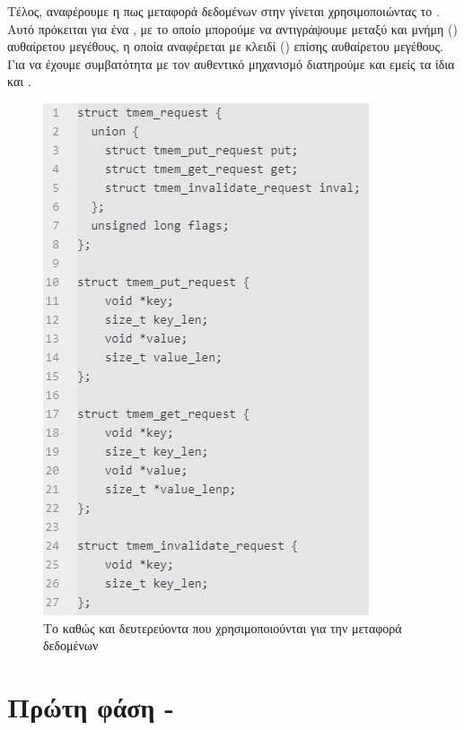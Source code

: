 Τέλος, αναφέρουμε η πως μεταφορά δεδομένων στην  γίνεται
χρησιμοποιώντας το . Αυτό πρόκειται για
ένα , με το οποίο μπορούμε να αντιγράψουμε μεταξύ
 και  μνήμη () αυθαίρετου μεγέθους, η οποία
αναφέρεται με κλειδί () επίσης αυθαίρετου μεγέθους. Για να
έχουμε συμβατότητα με τον αυθεντικό μηχανισμό διατηρούμε και
εμείς τα ίδια  και .
\newline

\begin{figure}[h]
  \includegraphics[height=0.4\paperheight]{pictures/struct2.PNG}
  \caption{Το  καθώς και δευτερεύοντα
   που χρησιμοποιούνται για την μεταφορά δεδομένων}
  \label{fig:structure}
\end{figure}


\section{Πρώτη φάση - }

